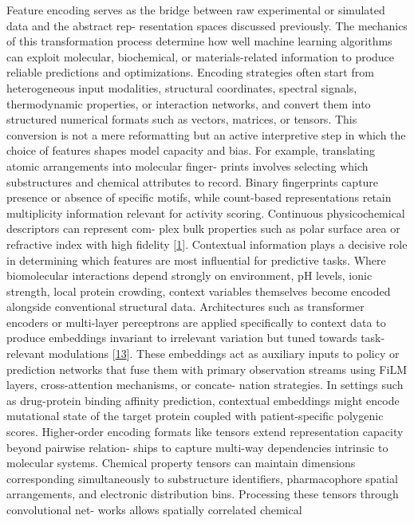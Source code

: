 \documentclass[
]{article}
\begin{document}
Feature encoding serves as the bridge between raw experimental or
simulated data and the abstract rep- resentation spaces discussed
previously. The mechanics of this transformation process determine how
well machine learning algorithms can exploit molecular, biochemical, or
materials-related information to produce reliable predictions and
optimizations. Encoding strategies often start from heterogeneous input
modalities, structural coordinates, spectral signals, thermodynamic
properties, or interaction networks, and convert them into structured
numerical formats such as vectors, matrices, or tensors. This conversion
is not a mere reformatting but an active interpretive step in which the
choice of features shapes model capacity and bias. For example,
translating atomic arrangements into molecular finger- prints involves
selecting which substructures and chemical attributes to record. Binary
fingerprints capture presence or absence of specific motifs, while
count-based representations retain multiplicity information relevant for
activity scoring. Continuous physicochemical descriptors can represent
com- plex bulk properties such as polar surface area or refractive index
with high fidelity {[}\protect\hyperlink{_bookmark41}{1}{]}. Contextual
information plays a decisive role in determining which features are most
influential for predictive tasks. Where biomolecular interactions depend
strongly on environment, pH levels, ionic strength, local protein
crowding, context variables themselves become encoded alongside
conventional structural data. Architectures such as transformer encoders
or multi-layer perceptrons are applied specifically to context data to
produce embeddings invariant to irrelevant variation but tuned towards
task-relevant modulations {[}\protect\hyperlink{_bookmark53}{13}{]}.
These embeddings act as auxiliary inputs to policy or prediction
networks that fuse them with primary observation streams using FiLM
layers, cross-attention mechanisms, or concate- nation strategies. In
settings such as drug-protein binding affinity prediction, contextual
embeddings might encode mutational state of the target protein coupled
with patient-specific polygenic scores. Higher-order encoding formats
like tensors extend representation capacity beyond pairwise relation-
ships to capture multi-way dependencies intrinsic to molecular systems.
Chemical property tensors can maintain dimensions corresponding
simultaneously to substructure identifiers, pharmacophore spatial
arrangements, and electronic distribution bins. Processing these tensors
through convolutional net- works allows spatially correlated chemical
\end{document}

